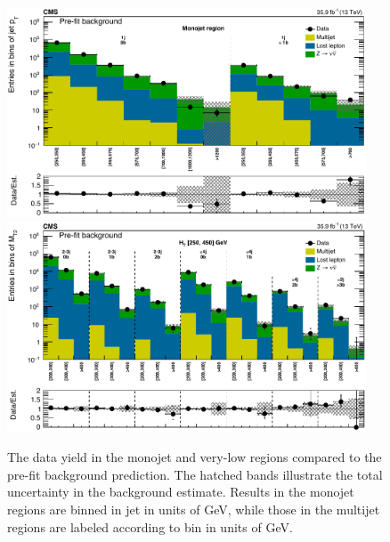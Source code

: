 \begin{figure}
	\centering
	\includegraphics[width=0.95\textwidth]{results/figs/mt2_monojet_fullEstimate}
	\includegraphics[width=0.95\textwidth]{results/figs/mt2_veryLowHT_fullEstimate}
	\renewcommand{\baselinestretch}{1.0}
	\caption[The data yield in the monojet and very-low \HT regions compared to the pre-fit background prediction.]{The data yield in the monojet and very-low \HT regions compared to the pre-fit background prediction. The hatched bands illustrate the total uncertainty in the background estimate. Results in the monojet regions are binned in jet \pt in units of GeV, while those in the multijet regions are labeled according to \mttwo bin in units of GeV.}
	\label{fig:yieldPrefit1}
\end{figure}
